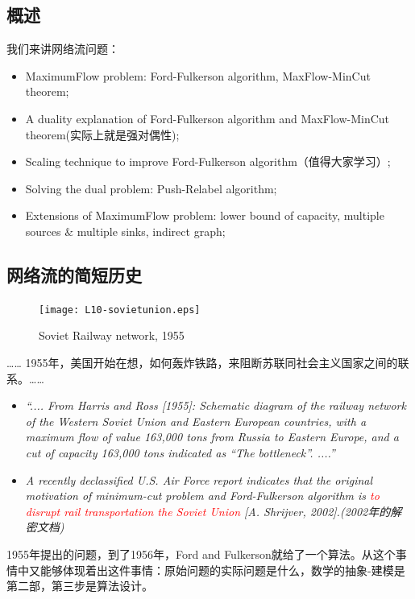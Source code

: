 \subsection{概述}
我们来讲网络流问题：
\begin{itemize}
\item {\sc MaximumFlow} problem: {\sc Ford-Fulkerson} algorithm, {\sc MaxFlow-MinCut} theorem;
\item A duality explanation of {\sc Ford-Fulkerson} algorithm and {\sc MaxFlow-MinCut} theorem(实际上就是强对偶性);
\item Scaling technique to improve {\sc Ford-Fulkerson} algorithm（值得大家学习）;
\item Solving the dual problem: Push-Relabel algorithm;
\item Extensions of {\sc MaximumFlow} problem: lower bound of capacity, multiple sources $\&$ multiple sinks, indirect graph;
\end{itemize}
\subsection{网络流的简短历史}

\begin{figure}[H]
 \texttt{[image: L10-sovietunion.eps]}
 \caption{Soviet Railway network, 1955}
\end{figure}
…… 1955年，美国开始在想，如何轰炸铁路，来阻断苏联同社会主义国家之间的联系。……
\begin{itemize}
 \item
\textit{``.... From Harris and Ross [1955]: Schematic diagram of the railway network of the Western
Soviet Union and Eastern European countries, with a maximum flow of value 163,000 tons
from Russia to Eastern Europe, and a cut of capacity 163,000 tons indicated as “The
bottleneck”. ....''}

\item
\textit{A recently declassified U.S. Air Force report indicates that the original motivation of minimum-cut problem and Ford-Fulkerson algorithm is \textcolor{red}{ to disrupt rail transportation the Soviet Union} [A. Shrijver, 2002].(2002年的解密文档) }
\end{itemize}
1955年提出的问题，到了1956年，Ford and Fulkerson就给了一个算法。从这个事情中又能够体现着出这件事情：原始问题的实际问题是什么，数学的抽象-建模是第二部，第三步是算法设计。

